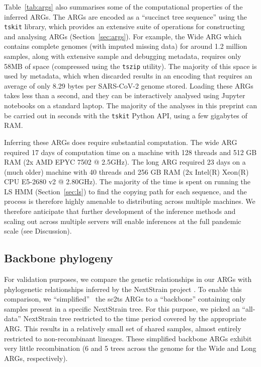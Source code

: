 \documentclass{article}
\begin{document}
Table~\ref{tab:args} also summarises some of the computational
properties of the inferred ARGs.
The ARGs are encoded as a ``succinct tree sequence'' using
the \texttt{tskit} library, which provides an extensive
suite of operations for constructing and analysing ARGs
(Section~\ref{sec:args}). For example, the Wide ARG
which contains complete genomes (with imputed missing data)
for around 1.2 million samples, along with extensive sample
and debugging metadata, requires only 58MB of space (compressed
using the \texttt{tszip} utility). The majority of this
space is used by metadata, which when discarded results in
an encoding that requires an average of only 8.29 bytes per
SARS-CoV-2 genome stored.
Loading these ARGs takes less than a second, and they can be interactively
analysed using Jupyter notebooks on a standard laptop. The majority
of the analyses in this preprint can be carried out in seconds
with the \texttt{tskit} Python API, using a few gigabytes of RAM.

Inferring these ARGs does require substantial computation.
The wide ARG required 17 days of computation time on a machine with
128 threads and 512 GB RAM (2x AMD EPYC 7502 @ 2.5GHz). The long ARG
required 23 days on a (much older) machine with 40 threads and 256 GB RAM (2x
Intel(R) Xeon(R) CPU E5-2680 v2 @ 2.80GHz). The majority of the time is spent
on running the LS HMM (Section~\ref{sec:ls}) to find the copying
path for each sequence, and the process
is therefore highly amenable to distributing across multiple machines.
We therefore anticipate that further development of the
inference methods and scaling out across multiple servers will
enable inferences at the full pandemic scale
(see Discussion).

\subsection{Backbone phylogeny}
\label{sec:backbone_phylogeny}
For validation purposes, we compare the genetic
relationships in our ARGs with phylogenetic relationships
inferred by the NextStrain project \citep{Hadfield2018-ef}.
To enable this comparison, we ``simplified''~\citep{Kelleher2018-xc}
the sc2ts ARGs to a ``backbone'' containing only samples present
in a specific NextStrain tree. For this purpose, we picked an
``all-data''  NextStrain tree restricted to the time period covered
by the appropriate ARG. This results in a relatively small
set of shared samples, almost entirely restricted to non-recombinant lineages.
These simplified backbone ARGs exhibit very
little recombination (6 and 5 trees across the genome for the Wide and Long
ARGs, respectively).
\end{document}
